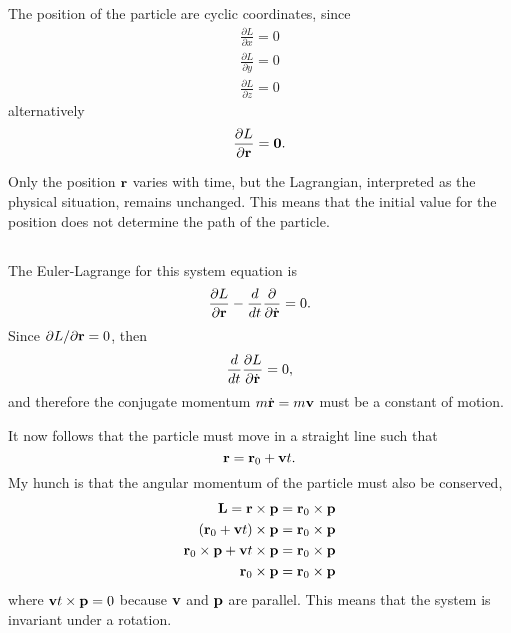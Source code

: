 \documentclass[11pt]{amsart}
\begin{document}
\subsection{}
The position of the particle are cyclic coordinates, since
\begin{align*}
\frac{\partial L}{\partial x} = 0 \\
\frac{\partial L}{\partial y} = 0 \\
\frac{\partial L}{\partial z} = 0 
\end{align*}
alternatively
\begin{equation}
\frac{\partial L}{\partial \vb{r}} = \vb{0}.
\end{equation}

Only the position $\vb{r}$ varies with time, but the Lagrangian, interpreted as the physical situation, remains unchanged. This means that the initial value for the position does not determine the path of the particle. 

\subsection{}
The Euler-Lagrange for this system equation is
\begin{equation}
\frac{\partial L}{\partial \vb{r}} - \frac{d}{dt}\frac{\partial}{\partial\dot{\vb{r}}} = 0.
\end{equation}
Since $\partial L / \partial \vb{r} = 0$, then
\begin{equation*}
\frac{d}{dt}\frac{\partial L}{\partial \dot{\vb{r}}} = 0,
\end{equation*}
and therefore the conjugate momentum $m\dot{\vb{r}}=m\vb{v}$ must be a constant of motion.

It now follows that the particle must move in a straight line such that
\begin{equation}
\vb{r} = \vb{r}_0 + \vb{v}t.
\end{equation}
My hunch is that the angular momentum of the particle must also be conserved,
\begin{align*}
\vb{L} = \vb{r} \times \vb{p} &= \vb{r}_0 \times \vb{p} \\
(\vb{r}_0 + \vb{v}t) \times \vb{p} &= \vb{r}_0 \times \vb{p} \\
\vb{r}_0 \times \vb{p} + \vb{v}t \times \vb{p} &= \vb{r}_0 \times \vb{p} \\
\vb{r}_0 \times \vb{p} &= \vb{r}_0 \times \vb{p}
\end{align*}
where $\vb{v}t \times \vb{p} = 0$ because $\vb{v}$ and $\vb{p}$ are parallel. This means that the system is invariant under a rotation.
\end{document}
